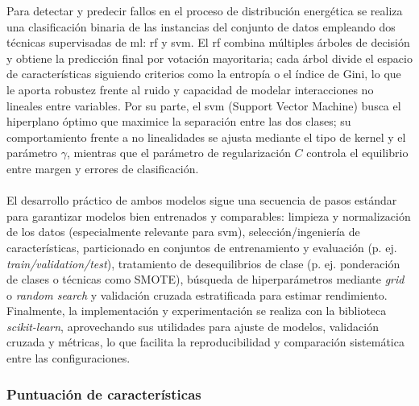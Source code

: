Para detectar y predecir fallos en el proceso de distribución energética se realiza una clasificación binaria de las instancias del conjunto de datos empleando dos técnicas supervisadas de \gls{ml}: \gls{rf} y \gls{svm}. El \gls{rf}  combina múltiples árboles de decisión y obtiene la predicción final por votación mayoritaria; cada árbol divide el espacio de características siguiendo criterios como la entropía o el índice de Gini, lo que le aporta robustez frente al ruido y capacidad de modelar interacciones no lineales entre variables. Por su parte, el \gls{svm} (Support Vector Machine) busca el hiperplano óptimo que maximice la separación entre las dos clases; su comportamiento frente a no linealidades se ajusta mediante el tipo de kernel y el parámetro \(\gamma\), mientras que el parámetro de regularización \(C\) controla el equilibrio entre margen y errores de clasificación.\\
\\
El desarrollo práctico de ambos modelos sigue una secuencia de pasos estándar para garantizar modelos bien entrenados y comparables: limpieza y normalización de los datos (especialmente relevante para \gls{svm}), selección/ingeniería de características, particionado en conjuntos de entrenamiento y evaluación (p. ej. \textit{train/validation/test}), tratamiento de desequilibrios de clase (p. ej. ponderación de clases o técnicas como SMOTE), búsqueda de hiperparámetros mediante \textit{grid} o \textit{random search} y validación cruzada estratificada para estimar rendimiento. Finalmente, la implementación y experimentación se realiza con la biblioteca \textit{scikit-learn}, aprovechando sus utilidades para ajuste de modelos, validación cruzada y métricas, lo que facilita la reproducibilidad y comparación sistemática entre las configuraciones.

\subsubsection{Puntuación de características}
\label{sec:puntua}

